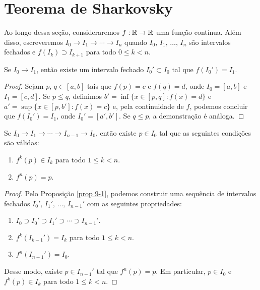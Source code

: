 \section{Teorema de Sharkovsky}

Ao longo dessa seção, consideraremos $f: \mathbb{R} \to \mathbb{R}$ uma função contínua.
Além disso, escreveremos $I_0 \longrightarrow I_1 \longrightarrow \cdots \longrightarrow I_n$ quando $I_0, \, I_1, \, \dots, \, I_n$ são intervalos fechados e $f(I_k) \supset I_{k+1}$ para todo $0 \leq k < n$.

\begin{proposition}\label{prop 9-1}
Se $I_0 \longrightarrow I_1$, então existe um intervalo fechado $I_0' \subset I_0$ tal que $f(I_0') = I_1$.
\end{proposition}

\begin{proof}
Sejam $p, \, q \in [a, b]$ tais que $f(p) = c$ e $f(q) = d$, onde $I_0 = [a, b]$ e $I_1 = [c, d]$.
Se $p \leq q$, definimos $b' = \inf \lbrace x \in [p, q] : f(x) = d \rbrace$ e $a' = \sup \lbrace x \in [p, b'] : f(x) = c \rbrace$ e, pela continuidade de $f$, podemos concluir que $f(I_0') = I_1$, onde $I_0' = [a', b']$.
Se $q \leq p$, a demonstração é análoga.
\end{proof}

\begin{lemma}
Se $I_0 \longrightarrow I_1 \longrightarrow \cdots \longrightarrow I_{n-1} \longrightarrow I_0$, então existe $p \in I_0$ tal que as seguintes condições são válidas:
\begin{enumerate}
\item $f^k(p) \in I_k$ para todo $1 \leq k < n$.
\item $f^n(p) = p$.
\end{enumerate}
\end{lemma}

\begin{proof}
Pelo Proposição \ref{prop 9-1}, podemos construir uma sequência de intervalos fechados $I_0', \, I_1', \, \dots, \, I_{n-1}'$ com as seguintes propriedades:
\begin{enumerate}[label=\alph*)]
\item $I_0 \supset I_0' \supset I_1' \supset \cdots \supset I_{n-1}'$.
\item $f^k(I_{k-1}') = I_k$ para todo $1 \leq k < n$.
\item $f^n(I_{n-1}') = I_0$.
\end{enumerate}

Desse modo, existe $p \in I_{n-1}'$ tal que $f^n(p) = p$.
Em particular, $p \in I_0$ e $f^k(p) \in I_k$ para todo $1 \leq k < n$.
\end{proof}

